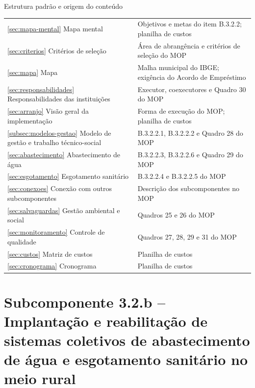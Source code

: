 \begin{quadro}[H]
\caption{Estrutura padrão e origem do conteúdo}
\label{qua:correspondencia}
\footnotesize
\renewcommand{\arraystretch}{1.2}
\begin{tabularx}{\textwidth}{|P{5.4cm}|L|}
\hline
{} &  \\ \hline
\ref{sec:mapa-mental} Mapa mental & Objetivos e metas do item B.3.2.2; planilha de custos \\ \hline
\ref{sec:criterios} Critérios de seleção & Área de abrangência e critérios de seleção do MOP \\ \hline
\ref{sec:mapa} Mapa & Malha municipal do IBGE; exigência do Acordo de Empréstimo \\ \hline
\ref{sec:responsabilidades} Responsabilidades das instituições & Executor, coexecutores e Quadro 30 do MOP \\ \hline
\ref{sec:arranjo} Visão geral da implementação & Forma de execução do MOP; planilha de custos \\ \hline
\ref{subsec:modelos-gestao} Modelo de gestão e trabalho técnico-social & B.3.2.2.1, B.3.2.2.2 e Quadro 28 do MOP \\ \hline
\ref{sec:abastecimento} Abastecimento de água & B.3.2.2.3, B.3.2.2.6 e Quadro 29 do MOP \\ \hline
\ref{sec:esgotamento} Esgotamento sanitário & B.3.2.2.4 e B.3.2.2.5 do MOP \\ \hline
\ref{sec:conexoes} Conexão com outros subcomponentes & Descrição dos subcomponentes no MOP \\ \hline
\ref{sec:salvaguardas} Gestão ambiental e social & Quadros 25 e 26 do MOP \\ \hline
\ref{sec:monitoramento} Controle de qualidade & Quadros 27, 28, 29 e 31 do MOP \\ \hline
\ref{sec:custos} Matriz de custos & Planilha de custos \\ \hline
\ref{sec:cronograma} Cronograma & Planilha de custos \\ \hline
\end{tabularx}
\end{quadro}

\chapter[Subcomponente 3.2.b -- Abastecimento e esgotamento no meio rural]%
{Subcomponente 3.2.b -- Implantação e reabilitação de sistemas coletivos de
abastecimento de água e esgotamento sanitário no meio rural}
\label{cap:3-2-b}

